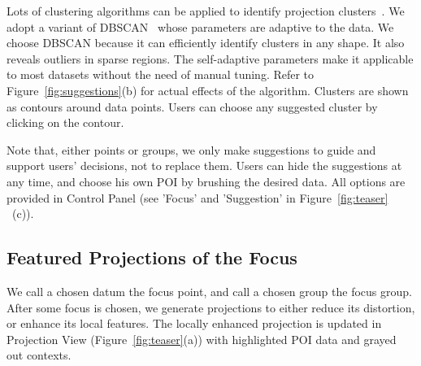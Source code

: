 
Lots of clustering algorithms can be applied to identify projection clusters~\cite{DBLP:conf/ieeevast/Kandogan12}. We adopt a variant of DBSCAN~\cite{zhou2012research} whose parameters are adaptive to the data. We choose DBSCAN because it can efficiently identify clusters in any shape. It also reveals outliers in sparse regions. The self-adaptive parameters make it applicable to most datasets without the need of manual tuning. Refer to Figure~\ref{fig:suggestions}(b) for actual effects of the algorithm. Clusters are shown as contours around data points. Users can choose any suggested cluster by clicking on the contour.

Note that, either points or groups, we only make suggestions to guide and support users' decisions, not to replace them. Users can hide the suggestions at any time, and choose his own POI by brushing the desired data. All options are provided in Control Panel (see 'Focus' and 'Suggestion' in Figure~\ref{fig:teaser} ~(c)).


\subsection{Featured Projections of the Focus}
We call a chosen datum the focus point, and call a chosen group the focus group. After some focus is chosen, we generate projections to either reduce its distortion, or enhance its local features. The locally enhanced projection is updated in Projection View (Figure~\ref{fig:teaser}(a)) with highlighted POI data and grayed out contexts.

